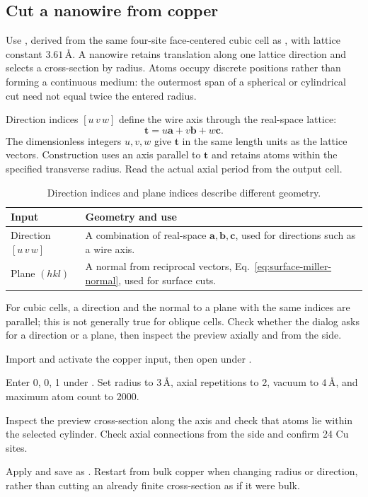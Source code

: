 \FloatBarrier
\subsection{Cut a nanowire from copper}

Use , derived from the same four-site face-centered cubic cell as , with lattice constant $3.61\,\text{\AA}$. A nanowire retains translation along one lattice direction and selects a cross-section by radius. Atoms occupy discrete positions rather than forming a continuous medium: the outermost span of a spherical or cylindrical cut need not equal twice the entered radius.

Direction indices $[u\,v\,w]$ define the wire axis through the real-space lattice:
\begin{equation}
  \mathbf t=u\mathbf a+v\mathbf b+w\mathbf c.
  \label{eq:nanowire-lattice-direction}
\end{equation}
The dimensionless integers $u,v,w$ give $\mathbf t$ in the same length units as the lattice vectors. Construction uses an axis parallel to $\mathbf t$ and retains atoms within the specified transverse radius. Read the actual axial period from the output cell.

\begin{table}[htbp]
\centering
\caption{Direction indices and plane indices describe different geometry.}
\begin{tabularx}{\linewidth}{lX}
\toprule
Input & Geometry and use\\
\midrule
Direction $[u\,v\,w]$ & A combination of real-space $\mathbf a,\mathbf b,\mathbf c$, used for directions such as a wire axis.\\
Plane $(hkl)$ & A normal from reciprocal vectors, Eq.~\eqref{eq:surface-miller-normal}, used for surface cuts.\\
\bottomrule
\end{tabularx}
\end{table}

For cubic cells, a direction and the normal to a plane with the same indices are parallel; this is not generally true for oblique cells. Check whether the dialog asks for a direction or a plane, then inspect the preview axially and from the side.

\begin{steps}
  \item Import and activate the copper input, then open  under .
  \item Enter 0, 0, 1 under . Set radius to $3\,\text{\AA}$, axial repetitions to 2, vacuum to $4\,\text{\AA}$, and maximum atom count to 2000.
  \item Inspect the preview cross-section along the axis and check that atoms lie within the selected cylinder. Check axial connections from the side and confirm 24 Cu sites.
  \item Apply and save as . Restart from bulk copper when changing radius or direction, rather than cutting an already finite cross-section as if it were bulk.
\end{steps}

